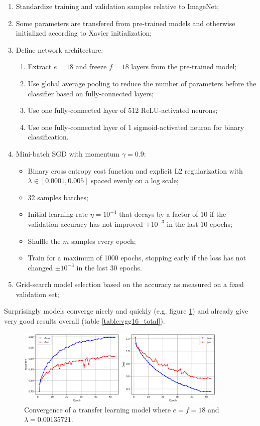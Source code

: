 \begin{enumerate}
    \item Standardize training and validation samples relative to ImageNet;
    \item Some parameters are transfered from pre-trained models and otherwise initialized according to Xavier initialization;
    \item Define network architecture:
        \begin{enumerate}
            \item Extract $e = 18$ and freeze $f = 18$ layers from the pre-trained model;
            \item Use global average pooling to reduce the number of parameters before the classifier based on fully-connected layers;
            \item Use one fully-connected layer of 512 ReLU-activated neurons;
            \item Use one fully-connected layer of 1 sigmoid-activated neuron for binary classification.
        \end{enumerate}
    \item Mini-batch \ac{SGD} with momentum $\gamma = 0.9$:
        \begin{itemize}
            \item Binary cross entropy cost function and explicit L2 regularization with $\lambda \in [0.0001, 0.005]$ spaced evenly on a log scale;
            \item 32 samples batches;
            \item Initial learning rate $\eta = 10^{-4}$ that decays by a factor of $10$ if the validation accuracy has not improved $+10^{-3}$ in the last $10$ epochs;
            \item Shuffle the $m$ samples every epoch;
            \item Train for a maximum of 1000 epochs, stopping early if the loss has not changed $\pm 10^{-3}$ in the last $30$ epochs.
        \end{itemize}
    \item Grid-search model selection based on the accuracy as measured on a fixed validation set;
\end{enumerate}

Surprisingly models converge nicely and quickly (e.g. figure \ref{fig:vgg16_total_convergence}) and already give very good results overall (table \ref{table:vgg16_total}).

\begin{figure}[ht]
    \centering
    \includegraphics[width=0.9\textwidth]{figs/vgg16_total_convergence.png}
    \caption{Convergence of a transfer learning model where $e = f = 18$ and $\lambda = 0.00135721$.}
    \label{fig:vgg16_total_convergence}
\end{figure}

